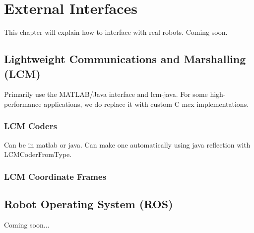 \chapter{External Interfaces}

This chapter will explain how to interface with real robots.  Coming soon.

\section{Lightweight Communications and Marshalling (LCM)}

Primarily use the MATLAB/Java interface and lcm-java.  For some high-performance applications, we do replace it with custom C mex implementations.

\subsection{LCM Coders}

Can be in matlab or java.  Can make one automatically using java reflection with LCMCoderFromType.

\subsection{LCM Coordinate Frames}



\section{Robot Operating System (ROS)}

Coming soon...
